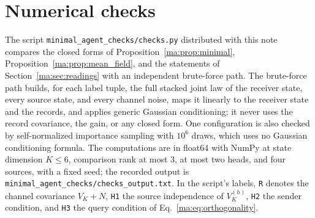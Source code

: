 \documentclass[11pt]{article}
\theoremstyle{definition}
\theoremstyle{remark}
\begin{document}
\section{Numerical checks}
\label{ma:app:checks}

The script \texttt{minimal\_agent\_checks/checks.py} distributed with this note compares the closed forms of Proposition~\ref{ma:prop:minimal}, Proposition~\ref{ma:prop:mean_field}, and the statements of Section~\ref{ma:sec:readings} with an independent brute-force path. The brute-force path builds, for each label tuple, the full stacked joint law of the receiver state, every source state, and every channel noise, maps it linearly to the receiver state and the records, and applies generic Gaussian conditioning; it never uses the record covariance, the gain, or any closed form. One configuration is also checked by self-normalized importance sampling with $10^6$ draws, which uses no Gaussian conditioning formula. The computations are in float64 with NumPy at state dimension $K\le6$, comparison rank at most $3$, at most two heads, and four sources, with a fixed seed; the recorded output is \texttt{minimal\_agent\_checks/checks\_output.txt}. In the script's labels, \texttt{R} denotes the channel covariance $V_K+N$, \texttt{H1} the source independence of $V^{(h)}_K$, \texttt{H2} the sender condition, and \texttt{H3} the query condition of Eq.~\eqref{ma:eq:orthogonality}.
\end{document}
